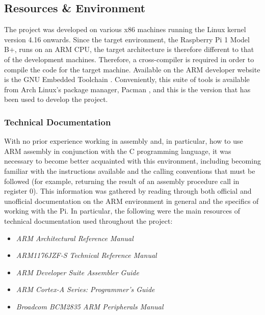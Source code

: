 \subsection{Resources \& Environment}
    The project was developed on various x86 machines running the Linux kernel
    version 4.16 onwards. Since the target environment, the Raspberry Pi 1 Model
    B+, runs on an ARM CPU, the target architecture is therefore different to
    that of the development machines. Therefore, a cross-compiler is required in
    order to compile the code for the target machine. Available on the ARM
    developer website is the GNU Embedded Toolchain \cite{GNUToolchain}.
    Conveniently, this suite of tools is available from Arch Linux's package
    manager, Pacman \cite{PacmanEABI}, and this is the version that has been
    used to develop the project.

    \subsubsection{Technical Documentation}
        With no prior experience working in assembly and, in particular, how to
        use ARM assembly in conjunction with the C programming language, it was
        necessary to become better acquainted with this environment, including
        becoming familiar with the instructions available and the calling
        conventions that must be followed (for example, returning the result of
        an assembly procedure call in register 0). This information was gathered
        by reading through both official and unofficial documentation on the ARM
        environment in general and the specifics of working with the Pi. In
        particular, the following were the main resources of technical
        documentation used throughout the project:
        \begin{itemize}
            \itemsep0em 
            \item \textit{ARM Architectural Reference Manual} \cite{ARMARM}
            \item \textit{ARM1176JZF-S Technical Reference Manual} \cite{TRM}
            \item \textit{ARM Developer Suite Assembler Guide}
                \cite{OnlineARMGuide}
            \item \textit{ARM Cortex-A Series: Programmer's Guide}
                \cite{ProgrammersGuide}
            \item \textit{Broadcom BCM2835 ARM Peripherals Manual} \cite{BCM2835}
        \end{itemize}

